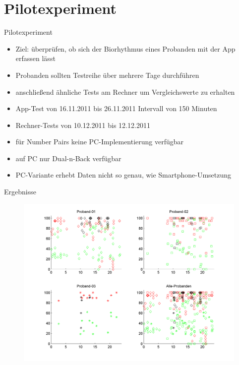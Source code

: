 \section{Pilotexperiment}

\begin{frame}{Pilotexperiment}
	\begin{itemize}[<+->]
	\item Ziel: überprüfen, ob sich der Biorhythmus eines Probanden mit der App erfassen lässt
	\item Probanden sollten Testreihe über mehrere Tage durchführen
	\item anschließend ähnliche Tests am Rechner um Vergleichswerte zu erhalten
	\item App-Test von 16.11.2011 bis 26.11.2011 Intervall von 150 Minuten
	\item Rechner-Tests von 10.12.2011 bis 12.12.2011 
	\item für Number Pairs keine PC-Implementierung verfügbar
	\item auf PC nur Dual-n-Back verfügbar
	\item PC-Variante erhebt Daten nicht so genau, wie Smartphone-Umsetzung
	\end{itemize}
\end{frame}
\begin{frame}{Ergebnisse}
	\begin{figure}[hbtp]
	\centering
	\includegraphics[width=0.8\linewidth]{pictures/NBack_Uebersicht}
	
	\label{fig:results_first_experiment}
	\end{figure}
\end{frame}

